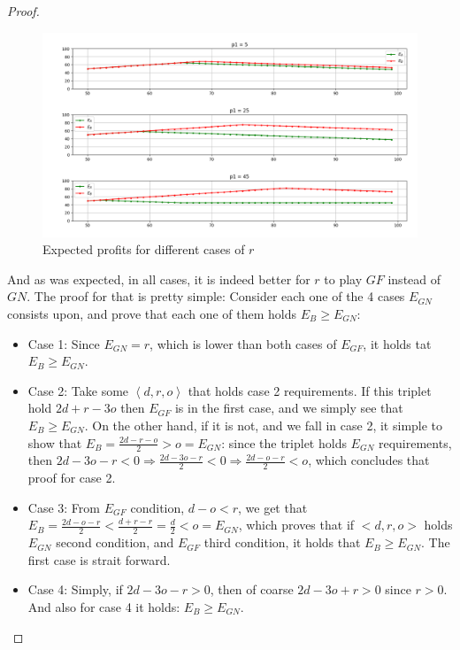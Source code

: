 \documentclass[a4paper,10pt]{article}
\newcommand\rob{\ensuremath{r}\xspace}
\newcommand{\gn}{\ensuremath{GN}\xspace}
\newcommand{\gf}{\ensuremath{GF}\xspace}
\begin{document}
\begin{proof}
\begin{figure}[H]
\includegraphics[width=\textwidth]{Images/GainedProfitp2SecondHalfWorld.png}
\caption{Expected profits for different cases of \rob}
\end{figure}

And as was expected, in all cases, it is indeed better for \rob to play $\gf$ instead of \gn. The proof for that is pretty simple: Consider each one of the 4 cases $E_\gn$ consists upon, and prove that each one of them holds $E_B \geq E_\gn$:
\begin{itemize}
\item Case 1: Since $E_\gn=r$, which is lower than both cases of $E_\gf$, it holds tat $E_B \geq E_\gn$.
\item Case 2: Take some $\left<d,r,o\right>$ that holds case 2 requirements. If this triplet hold $2d+r-3o$ then $E_\gf$ is in the first case, and we simply see that $E_B \geq E_\gn$. On the other hand, if it is not, and we fall in case 2, it simple to show that $E_B =\frac{2d-r-o}{2} > o = E_\gn$: since the triplet holds $E_\gn$ requirements, then $2d-3o-r<0\Rightarrow \frac{2d-3o-r}{2}<0\Rightarrow \frac{2d-o-r}{2}<o$, which concludes that proof for case 2.
\item Case 3: From $E_\gf$ condition, $d-o<r$, we get that $E_B=\frac{2d-o-r}{2}<\frac{d+r-r}{2}=\frac{d}{2}<o=E_\gn$, which proves that if $<d,r,o>$ holds $E_\gn$ second condition, and $E_\gf$ third condition, it holds that $E_B\geq E_\gn$. The first case is strait forward.
\item Case 4: Simply, if $2d-3o-r>0$, then of coarse $2d-3o+r>0$ since $r>0$. And also for case 4 it holds: $E_B \geq E_\gn$.
\end{itemize}

\end{proof}
\end{document}
